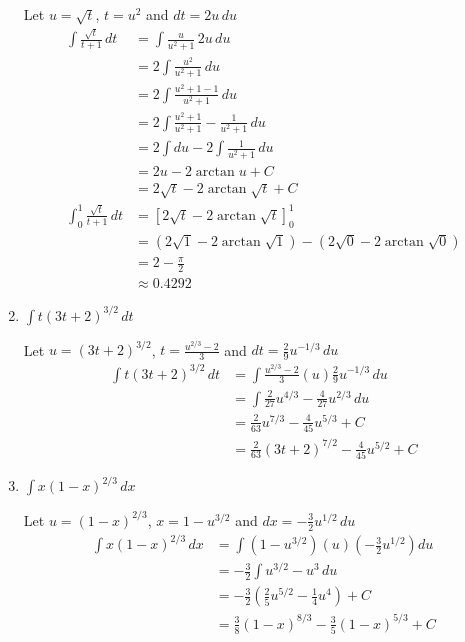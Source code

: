 \documentclass[12pt]{article}
\begin{document}
\begin{enumerate}
Let $u=\sqrt{t}$, $t=u^{2}$ and $dt=2u\,du$
\begin{equation*}
  \begin{aligned}
  \int\frac{\sqrt{t}}{t+1}\,dt &=\int\frac{u}{u^{2}+1}\,2u\,du\\
  &=2\int\frac{u^{2}}{u^{2}+1}\,du\\
  &=2\int\frac{u^{2}+1-1}{u^{2}+1}\,du\\
  &=2\int\frac{u^{2}+1}{u^{2}+1}-\frac{1}{u^{2}+1}\,du\\
  &=2\int du - 2\int\frac{1}{u^{2}+1}\,du\\
  &=2u - 2\arctan u + C \\
  &=2\sqrt{t} - 2\arctan\sqrt{t} + C \\
  \int_0^1\frac{\sqrt{t}}{t+1}\,dt &=\left[2\sqrt{t} - 2\arctan\sqrt{t}\right]_0^1\\
  &=\left(2\sqrt{1} - 2\arctan\sqrt{1}\right)-\left(2\sqrt{0} - 2\arctan\sqrt{0}\right)\\
  &=2-\frac{\pi}{2}\\
  &\approx 0.4292
  \end{aligned}
\end{equation*}

\item $\displaystyle\int t(3t+2)^{3/2}\,dt$

Let $u=(3t+2)^{3/2}$, $t=\displaystyle\frac{u^{2/3}-2}{3}$ and $dt=\displaystyle\frac{2}{9}u^{-1/3}\,du$
\begin{equation*}
  \begin{aligned}
  \int t(3t+2)^{3/2}\,dt&=\int\frac{u^{2/3}-2}{3}(u)\frac{2}{9}u^{-1/3}\,du\\
  &=\int\frac{2}{27}u^{4/3}-\frac{4}{27}u^{2/3}\,du\\
  &=\frac{2}{63}u^{7/3}-\frac{4}{45}u^{5/3}+C\\
  &=\frac{2}{63}(3t+2)^{7/2}-\frac{4}{45}u^{5/2}+C
  \end{aligned}
\end{equation*}

\item $\displaystyle\int x(1-x)^{2/3}\,dx$

Let $u=(1-x)^{2/3}$, $x=1-u^{3/2}$ and $dx=\displaystyle-\frac{3}{2}u^{1/2}\,du$
\begin{equation*}
  \begin{aligned}
  \int x(1-x)^{2/3}\,dx &=\int(1-u^{3/2})(u)\left(-\frac{3}{2}u^{1/2}\right)du\\
  &=-\frac{3}{2}\int u^{3/2}-u^{3}\,du\\
  &=-\frac{3}{2}\left(\frac{2}{5}u^{5/2}-\frac{1}{4}u^{4}\right)+C\\
  &=\frac{3}{8}(1-x)^{8/3}-\frac{3}{5}(1-x)^{5/3}+C
  \end{aligned}
\end{equation*}






\end{enumerate}
\end{document}
